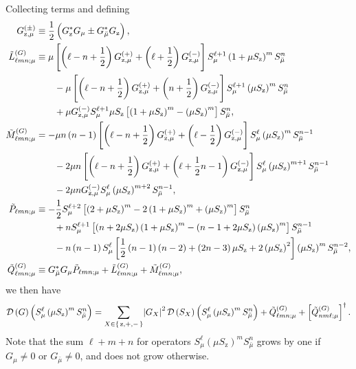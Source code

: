 \documentclass[pra,twocolumn,longbibliography]{revtex4-2}
\newcommand{\f}[2]{\dfrac{#1}{#2}} %
\newcommand{\p}[1]{\left( #1 \right)} %
\renewcommand{\sp}[1]{\left[ #1 \right]} %
\newcommand{\D}{\mathcal{D}}
\newcommand{\z}{\text{z}}
\newcommand{\bmu}{{\bar\mu}}
\newcommand{\1}{\mathds{1}}
\begin{document}
Collecting terms and defining
\begin{align}
  G_{\z,\mu}^{(\pm)}
  &\equiv \f12\p{G_\z^* G_\mu \pm G_\bmu^* G_\z},
  \allowdisplaybreaks \\
  \tilde L_{\ell mn;\mu}^{(G)}
  &\equiv \mu \sp{\p{\ell-n+\f12} G_{\z,\mu}^{(+)}
    + \p{\ell+\f12} G_{\z,\mu}^{(-)}}
  S_\mu^{\ell+1} \p{1+\mu S_\z}^m S_\bmu^n \notag \\
  &\qquad -\mu \sp{\p{\ell-n+\f12} G_{\z,\mu}^{(+)}
    + \p{n+\f12} G_{\z,\mu}^{(-)}}
  S_\mu^{\ell+1} \p{\mu S_\z}^m S_\bmu^n \notag \\
  &\qquad + \mu G_{\z,\mu}^{(-)}
  S_\mu^{\ell+1} \mu S_\z
  \sp{\p{1+\mu S_\z}^m - \p{\mu S_\z}^m} S_\bmu^n,
  \allowdisplaybreaks \\
  \tilde M_{\ell mn;\mu}^{(G)}
  &= -\mu n\p{n-1} \sp{\p{\ell-n+\f12} G_{\z,\mu}^{(+)}
    + \p{\ell-\f12} G_{\z,\mu}^{(-)}}
  S_\mu^\ell \p{\mu S_\z}^m S_\bmu^{n-1} \notag \\
  &\qquad - 2\mu n \sp{\p{\ell-n+\f12} G_{\z,\mu}^{(+)}
    + \p{\ell+\f12n-1} G_{\z,\mu}^{(-)}}
  S_\mu^\ell \p{\mu S_\z}^{m+1} S_\bmu^{n-1} \notag \\
  &\qquad - 2\mu n G_{\z,\mu}^{(-)}
  S_\mu^\ell \p{\mu S_\z}^{m+2} S_\bmu^{n-1},
  \allowdisplaybreaks \\
  \tilde P_{\ell mn;\mu}
  &\equiv -\f12 S_\mu^{\ell+2}
  \sp{\p{2+\mu S_\z}^m - 2\p{1+\mu S_\z}^m + \p{\mu S_\z}^m}
  S_\bmu^n \notag \\
  &\qquad + n S_\mu^{\ell+1} \sp{\p{n+2\mu S_\z} \p{1+\mu S_\z}^m
    - \p{n-1+2\mu S_\z} \p{\mu S_\z}^m}
  S_\bmu^{n-1} \notag \\
  &\qquad -n\p{n-1} S_\mu^\ell
  \sp{\f12\p{n-1}\p{n-2} + \p{2n-3}\mu S_\z + 2\p{\mu S_\z}^2}
  \p{\mu S_\z}^m S_\bmu^{n-2},
  \allowdisplaybreaks \\
  \tilde Q_{\ell mn;\mu}^{(G)}
  &\equiv G_\bmu^* G_\mu \tilde P_{\ell mn;\mu}
  + \tilde L_{\ell mn;\mu}^{(G)}
  + \tilde M_{\ell mn;\mu}^{(G)},
\end{align}
we then have
\begin{align}
  \D\p{G} \p{S_\mu^\ell \p{\mu S_\z}^m S_\bmu^n}
  = \sum_{X\in\set{\z,+,-}} \abs{G_X}^2
  \D\p{S_X} \p{S_\mu^\ell \p{\mu S_\z}^m S_\bmu^n}
  + \tilde Q_{\ell mn;\mu}^{(G)}
  + \sp{\tilde Q_{nm\ell;\mu}^{(G)}}^\dag.
\end{align}
Note that the sum $\ell+m+n$ for operators
$S_\mu^\ell \p{\mu S_\z}^m S_\bmu^n$ grows by one if $G_\mu\ne0$ or
$G_\bmu\ne0$, and does not grow otherwise.
\end{document}
